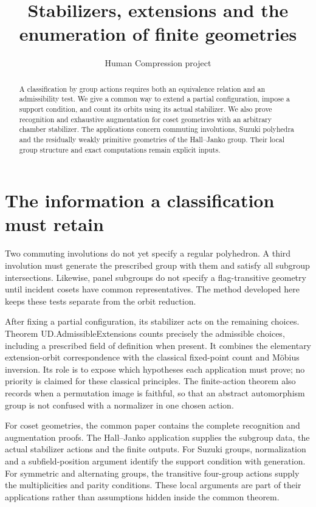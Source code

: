 
\title{Stabilizers, extensions and the enumeration of finite geometries}
\author{Human Compression project}
\date{}

\maketitle
\begin{abstract}
A classification by group actions requires both an equivalence relation and
an admissibility test. We give a common way to extend a partial configuration,
impose a support condition, and count its orbits using its actual stabilizer.
We also prove recognition and exhaustive augmentation for coset geometries
with an arbitrary chamber stabilizer. The applications concern commuting
involutions, Suzuki polyhedra and the residually weakly primitive geometries
of the Hall--Janko group. Their local group structure and exact computations
remain explicit inputs.
\end{abstract}
\section{The information a classification must retain}
Two commuting involutions do not yet specify a regular polyhedron. A third
involution must generate the prescribed group with them and satisfy all
subgroup intersections. Likewise, panel subgroups do not specify a
flag-transitive geometry until incident cosets have common representatives.
The method developed here keeps these tests separate from the orbit reduction.

After fixing a partial configuration, its stabilizer acts on the remaining
choices. Theorem UD.AdmissibleExtensions counts precisely the admissible
choices, including a prescribed field of definition when present. It combines
the elementary extension-orbit correspondence with the classical fixed-point
count and M\"obius inversion. Its role is to expose which hypotheses each
application must prove; no priority is claimed for these classical principles.
The finite-action theorem also records when a permutation image is faithful,
so that an abstract automorphism group is not confused with a normalizer in
one chosen action.

For coset geometries, the common paper contains the complete recognition and
augmentation proofs. The Hall--Janko application supplies the subgroup data,
the actual stabilizer actions and the finite outputs. For Suzuki groups,
normalization and a subfield-position argument identify the support condition
with generation. For symmetric and alternating groups, the transitive
four-group actions supply the multiplicities and parity conditions. These
local arguments are part of their applications rather than assumptions hidden
inside the common theorem.

